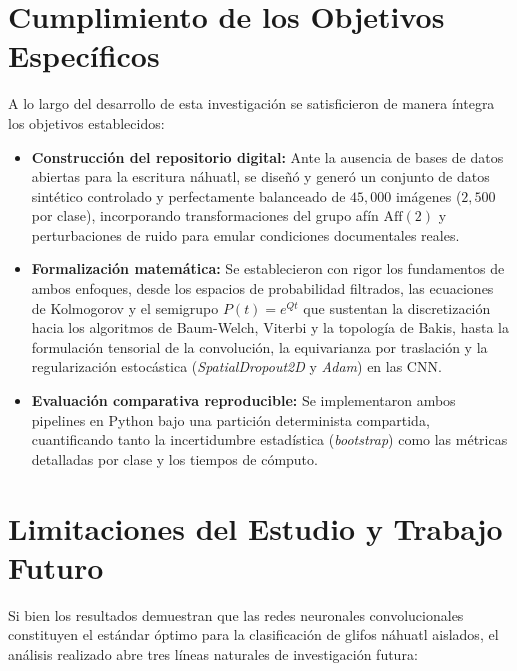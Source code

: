 \documentclass[
  spanish,
  us-letterpaper,
]{scrreprt}
\providecommand{\tightlist}{%
  \setlength{\itemsep}{0pt}\setlength{\parskip}{0pt}}
\theoremstyle{definition}
\theoremstyle{remark}
\begin{document}
\section{Cumplimiento de los Objetivos
Específicos}\label{cumplimiento-de-los-objetivos-especuxedficos}

A lo largo del desarrollo de esta investigación se satisficieron de
manera íntegra los objetivos establecidos:

\begin{itemize}
\tightlist
\item
  \textbf{Construcción del repositorio digital:} Ante la ausencia de
  bases de datos abiertas para la escritura náhuatl, se diseñó y generó
  un conjunto de datos sintético controlado y perfectamente balanceado
  de \(45{,}000\) imágenes (\(2{,}500\) por clase), incorporando
  transformaciones del grupo afín \(\mathrm{Aff}(2)\) y perturbaciones
  de ruido para emular condiciones documentales reales.
\item
  \textbf{Formalización matemática:} Se establecieron con rigor los
  fundamentos de ambos enfoques, desde los espacios de probabilidad
  filtrados, las ecuaciones de Kolmogorov y el semigrupo
  \(P(t) = e^{Qt}\) que sustentan la discretización hacia los algoritmos
  de Baum-Welch, Viterbi y la topología de Bakis, hasta la formulación
  tensorial de la convolución, la equivarianza por traslación y la
  regularización estocástica (\emph{SpatialDropout2D} y \emph{Adam}) en
  las CNN.
\item
  \textbf{Evaluación comparativa reproducible:} Se implementaron ambos
  pipelines en Python bajo una partición determinista compartida,
  cuantificando tanto la incertidumbre estadística (\emph{bootstrap})
  como las métricas detalladas por clase y los tiempos de cómputo.
\end{itemize}

\section{Limitaciones del Estudio y Trabajo
Futuro}\label{limitaciones-del-estudio-y-trabajo-futuro}

Si bien los resultados demuestran que las redes neuronales
convolucionales constituyen el estándar óptimo para la clasificación de
glifos náhuatl aislados, el análisis realizado abre tres líneas
naturales de investigación futura:
\end{document}
